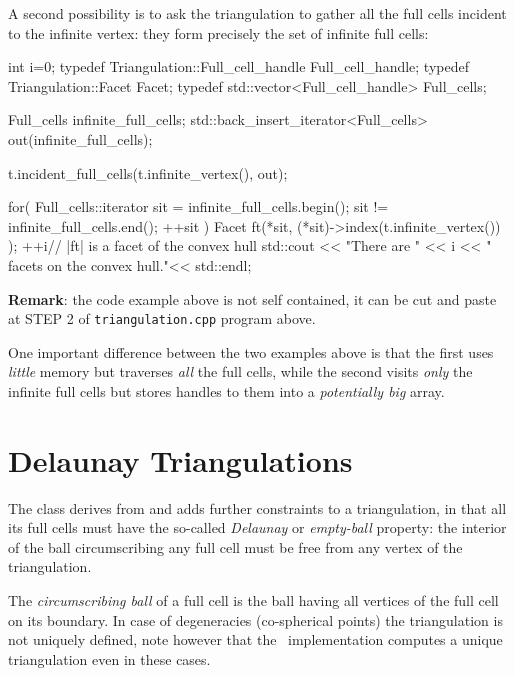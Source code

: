 A second possibility is to ask the triangulation to gather all the full cells
incident to the infinite vertex: they form precisely the set of infinite
full cells:

\begin{ccExampleCode}
{int i=0;
typedef Triangulation::Full_cell_handle Full_cell_handle;
typedef Triangulation::Facet Facet;
typedef std::vector<Full_cell_handle> Full_cells;

Full_cells infinite_full_cells;
std::back_insert_iterator<Full_cells> out(infinite_full_cells);

t.incident_full_cells(t.infinite_vertex(), out);

for( Full_cells::iterator sit = infinite_full_cells.begin(); 
       sit != infinite_full_cells.end(); ++sit ) {
    Facet ft(*sit, (*sit)->index(t.infinite_vertex()) );
    ++i// |ft| is a facet of the convex hull
}
std::cout << "There are " << i << " facets on the convex hull."<< std::endl;}
\end{ccExampleCode}
\textbf{Remark}: the code example above is not self contained, it can
be cut and paste at STEP 2 of {\tt triangulation.cpp} program above.

One important difference between the two examples above is that the first uses
\emph{little} memory but traverses \emph{all} the full cells, while the second
visits \emph{only} the infinite full cells but stores handles to them into a
\emph{potentially big} array.


\section{Delaunay Triangulations}%

The class  derives from
 and adds further constraints to a
triangulation, in that all its full cells must have the so-called
{\em Delaunay} or {\em empty-ball} property: the interior of the ball
circumscribing any full cell must be free from any vertex
of the triangulation.

The {\em circumscribing ball} of a full cell is the ball
having all vertices of the full cell on its boundary.
In case of degeneracies (co-spherical points) the triangulation is not
uniquely defined, 
note however that the \cgal\ implementation computes a unique
triangulation even in these cases. 

